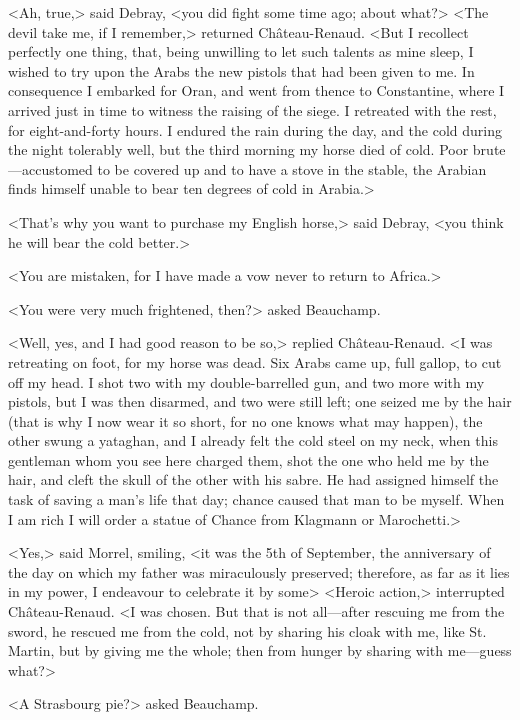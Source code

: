  <Ah, true,> said Debray, <you did fight some time ago; about what?>  <The devil take me, if I remember,> returned Château-Renaud. <But I recollect perfectly one thing, that, being unwilling to let such talents as mine sleep, I wished to try upon the Arabs the new pistols that had been given to me. In consequence I embarked for Oran, and went from thence to Constantine, where I arrived just in time to witness the raising of the siege. I retreated with the rest, for eight-and-forty hours. I endured the rain during the day, and the cold during the night tolerably well, but the third morning my horse died of cold. Poor brute—accustomed to be covered up and to have a stove in the stable, the Arabian finds himself unable to bear ten degrees of cold in Arabia.> 

 <That's why you want to purchase my English horse,> said Debray, <you think he will bear the cold better.> 

 <You are mistaken, for I have made a vow never to return to Africa.> 

 <You were very much frightened, then?> asked Beauchamp. 

 <Well, yes, and I had good reason to be so,> replied Château-Renaud. <I was retreating on foot, for my horse was dead. Six Arabs came up, full gallop, to cut off my head. I shot two with my double-barrelled gun, and two more with my pistols, but I was then disarmed, and two were still left; one seized me by the hair (that is why I now wear it so short, for no one knows what may happen), the other swung a yataghan, and I already felt the cold steel on my neck, when this gentleman whom you see here charged them, shot the one who held me by the hair, and cleft the skull of the other with his sabre. He had assigned himself the task of saving a man's life that day; chance caused that man to be myself. When I am rich I will order a statue of Chance from Klagmann or Marochetti.> 

 <Yes,> said Morrel, smiling, <it was the 5th of September, the anniversary of the day on which my father was miraculously preserved; therefore, as far as it lies in my power, I endeavour to celebrate it by some\longdash>  <Heroic action,> interrupted Château-Renaud. <I was chosen. But that is not all—after rescuing me from the sword, he rescued me from the cold, not by sharing his cloak with me, like St. Martin, but by giving me the whole; then from hunger by sharing with me—guess what?> 

 <A Strasbourg pie?> asked Beauchamp. 

